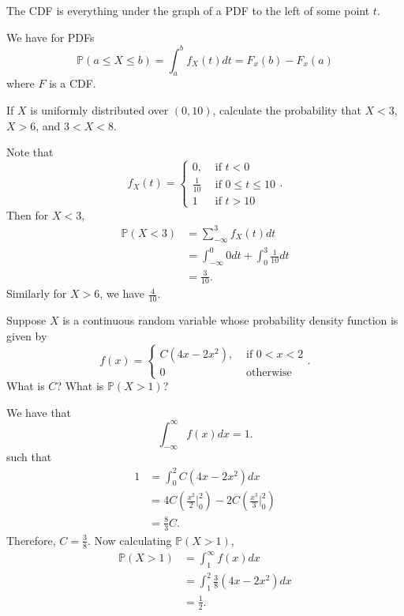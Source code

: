
\begin{definition}
	The CDF is everything under the graph of a PDF to the left of some point \( t \).
\end{definition}

\begin{theorem}
	We have for PDFs
	\[ \mathbb{P}(a\le X\le b) = \int_{a}^{b}f_X(t) dt = F_x(b) - F_x(a)\]
	where \( F \) is a CDF.
\end{theorem}

\begin{eg}
	If \( X \) is uniformly distributed over \( (0, 10) \), calculate the probability that \( X<3 \), \( X>6 \), and \( 3<X<8 \).
\end{eg}
\begin{explanation}
	Note that \[
		f_X(t) = \begin{cases}
			0, &\text{ if }t<0\\
			\frac{1}{10} &\text{ if } 0\le t\le 10 \\
			1 &\text{ if } t > 10
		\end{cases}
	.\] Then for \( X<3 \),
	\begin{align*}
		\mathbb{P}(X < 3) &= \sum_{-\infty}^{3} f_X(t) dt \\
		&= \int_{-\infty}^{0}0 dt + \int_{0}^{3}\frac{1}{10}dt  \\
		&= \frac{3}{10}
	.\end{align*}
	Similarly for \( X>6 \), we have \( \frac{4}{10} \).
\end{explanation}

\begin{eg}
	Suppose \( X \) is a continuous random variable whose probability density function is given by \[
		f(x) = \begin{cases}
			C(4x-2x^{2} ), &\text{ if }0<x<2\\
			0 &\text{ otherwise}
		\end{cases}
	.\] 
	What is \( C \)? What is \( \mathbb{P}(X>1) \)?
\end{eg}
\begin{explanation}
	We have that \[
		\int_{-\infty}^{\infty}f(x)dx = 1 
	.\] such that 
	\begin{align*}
		1 &= \int_{0}^{2}C(4x-2x^{2} ) dx\\
		&= 4C\left(\frac{x^{2} }{2} |_0^{2} \right) - 2C \left(\frac{x^{3} }{3} |_0^{2}\right)  \\
		&= \frac{8}{3}C 
	.\end{align*}
	Therefore, \( C = \frac{3}{8} \). Now calculating \( \mathbb{P}(X>1) \), 
	\begin{align*}
		\mathbb{P}(X>1) &= \int_{1}^{\infty} f(x)dx \\
										&= \int_{1}^{2}\frac{3}{8}(4x-2x^{2} )dx  \\
										&= \frac{1}{2} 
	.\end{align*}
\end{explanation}

